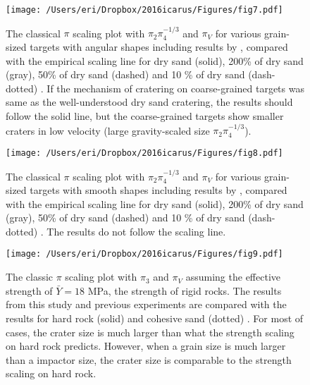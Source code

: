 \documentclass[3p,authoryear]{elsarticle}
\begin{document}
\begin{figure}[htbp]
	\begin{center}
	\texttt{[image: /Users/eri/Dropbox/2016icarus/Figures/fig7.pdf]}
	\caption{The classical $\pi$ scaling plot with $\pi_2\pi_4^{-1/3}$ and $\pi_V$ for various grain-sized targets with angular shapes including results by \citet{schmidt1980,mizutani1983,cintala1999}, compared with the empirical scaling line for dry sand (solid), 200\% of dry sand (gray), 50\% of dry sand (dashed) and 10 \% of dry sand (dash-dotted) \citep{schmidt1987}. If the mechanism of cratering on coarse-grained targets was same as the well-understood dry sand cratering, the results should follow the solid line, but the coarse-grained targets show smaller craters in low velocity (large gravity-scaled size $\pi_2\pi_4^{-1/3}$).}
	\label{pi2-pebble}
	\end{center}
\end{figure}

\begin{figure}[htbp]
	\begin{center}
	\texttt{[image: /Users/eri/Dropbox/2016icarus/Figures/fig8.pdf]}
	\caption{The classical $\pi$ scaling plot with $\pi_2\pi_4^{-1/3}$ and $\pi_V$ for various grain-sized targets with smooth shapes including results by \citet{schmidt1980,yamamoto2006,guettler2012}, compared with the empirical scaling line for dry sand (solid), 200\% of dry sand (gray), 50\% of dry sand (dashed) and 10 \% of dry sand (dash-dotted) \citep{schmidt1987}. The results do not follow the scaling line.}
	\label{pi2-gb}
	\end{center}
\end{figure}

\begin{figure}[htpb]
	\centering
	\texttt{[image: /Users/eri/Dropbox/2016icarus/Figures/fig9.pdf]}
	\caption{The classic $\pi$ scaling plot with $\pi_3$ and $\pi_V$ assuming the effective strength of $\bar{Y}=18$ MPa, the strength of rigid rocks. The results from this study and previous experiments \citep{schmidt1980,mizutani1983,cintala1999,yamamoto2006,guettler2012,holsapple2014} are compared with the results for hard rock (solid) and cohesive sand (dotted) \citep{schmidt1987}. For most of cases, the crater size is much larger than what the strength scaling on hard rock predicts. However, when a grain size is much larger than a impactor size, the crater size is comparable to the strength scaling on hard rock.}
	\label{pi3-scaling}
	\centering
\end{figure}
\end{document}
